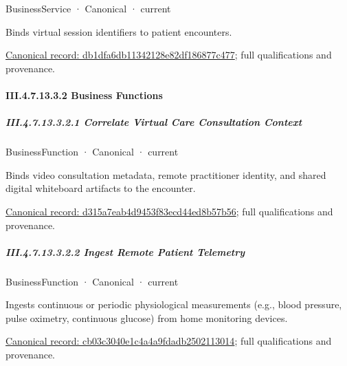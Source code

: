 \label{element:db1dfa6db11342128e82df186877c477}
{\small BusinessService · Canonical · current}\par

Binds virtual session identifiers to patient encounters.


{\footnotesize \href{../../../../continuum/business/business-service/db1dfa6db11342128e82df186877c477.md}{Canonical record: db1dfa6db11342128e82df186877c477}; full qualifications and provenance.}\par
\paragraph*{III.4.7.13.3.2 Business Functions}
\label{navigation:III.4.7.13.3.2}

\subparagraph*{III.4.7.13.3.2.1 Correlate Virtual Care Consultation Context}
\label{navigation:III.4.7.13.3.2.1}

\label{element:d315a7eab4d9453f83ecd44ed8b57b56}
{\small BusinessFunction · Canonical · current}\par

Binds video consultation metadata, remote practitioner identity, and shared digital whiteboard artifacts to the encounter.


{\footnotesize \href{../../../../continuum/business/business-function/d315a7eab4d9453f83ecd44ed8b57b56.md}{Canonical record: d315a7eab4d9453f83ecd44ed8b57b56}; full qualifications and provenance.}\par
\subparagraph*{III.4.7.13.3.2.2 Ingest Remote Patient Telemetry}
\label{navigation:III.4.7.13.3.2.2}

\label{element:cb03c3040e1c4a4a9fdadb2502113014}
{\small BusinessFunction · Canonical · current}\par

Ingests continuous or periodic physiological measurements (e.g., blood pressure, pulse oximetry, continuous glucose) from home monitoring devices.


{\footnotesize \href{../../../../continuum/business/business-function/cb03c3040e1c4a4a9fdadb2502113014.md}{Canonical record: cb03c3040e1c4a4a9fdadb2502113014}; full qualifications and provenance.}\par
